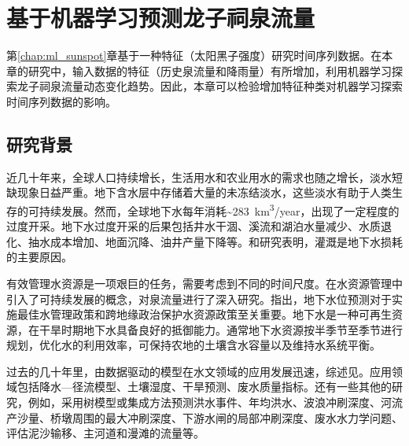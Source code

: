 \chapter{基于机器学习预测龙子祠泉流量}\label{chap:ml_spring}

第\ref{chap:ml_sunspot}章基于一种特征（太阳黑子强度）研究时间序列数据。在本章的研究中，输入数据的特征（历史泉流量和降雨量）有所增加，利用机器学习探索龙子祠泉流量动态变化趋势。因此，本章可以检验增加特征种类对机器学习探索时间序列数据的影响。

\section{研究背景}\label{sec:spr_background}

近几十年来，全球人口持续增长，生活用水和农业用水的需求也随之增长，淡水短缺现象日益严重\citep{portmann2010mirca2000,iglesias2015adaptation}。地下含水层中存储着大量的未冻结淡水，这些淡水有助于人类生存的可持续发展。然而，全球地下水每年消耗\sim\SI{283}{km^{3}/year}，出现了一定程度的过度开采\citep{wada2010global}。地下水过度开采的后果包括井水干涸、溪流和湖泊水量减少、水质退化、抽水成本增加、地面沉降、油井产量下降等\citep{bartolino2003ground,nayak2006groundwater}。\citet{dalin2017groundwater}和\citet{butler2018sustainability}研究表明，灌溉是地下水损耗的主要原因。

有效管理水资源是一项艰巨的任务，需要考虑到不同的时间尺度\citep{galelli2010building}。\citet{kresic2009groundwater}在水资源管理中引入了可持续发展的概念，对泉流量进行了深入研究。\citet{coppola2003artificial}指出，地下水位预测对于实施最佳水管理政策和跨地缘政治保护水资源政策至关重要。地下水是一种可再生资源，在干旱时期地下水具备良好的抵御能力。通常地下水资源按半季节至季节进行规划，优化水的利用效率，可保持农地的土壤含水容量以及维持水系统平衡。

过去的几十年里，由数据驱动的模型在水文领域的应用发展迅速，综述见\citep{abrahart2012two,deka2014support}。应用领域包括降水---径流模型\citep{dibike2001model,solomatine2003model,granata2016support}、土壤湿度\citep{ahmad2010estimating}、干旱预测\citep{le2016meteorological}、废水质量指标\citep{granata2017machine}。还有一些其他的研究，例如，采用树模型或集成方法预测洪水事件\citep{solomatine2004m5}、年均洪水\citep{singh2010estimation}、波浪冲刷深度\citep{etemad2011model}、河流产沙量\citep{goyal2014modeling}、桥墩周围的最大冲刷深度\citep{najafzadeh2016prediction}、下游水闸的局部冲刷深度\citep{najafzadeh2017prediction}、废水水力学问题\citep{granata2017machine}、评估泥沙输移\citep{najafzadeh2017application}、主河道和漫滩的流量\citep{zahiri2018optimized}等。

